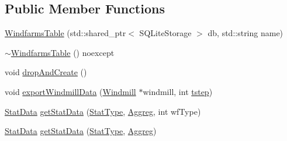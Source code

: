 \subsection*{Public Member Functions}
\begin{DoxyCompactItemize}
\item 
\mbox{\hyperlink{class_windfarms_table_a5d8d669ea442364440e5e2e92f5048b1}{Windfarms\+Table}} (std\+::shared\+\_\+ptr$<$ S\+Q\+Lite\+Storage $>$ db, std\+::string name)
\item 
\mbox{\hyperlink{class_windfarms_table_a39f4f1e8f169fee846df510dad569f2d}{$\sim$\+Windfarms\+Table}} () noexcept
\item 
void \mbox{\hyperlink{class_windfarms_table_aab2a278f7454d62d77d37b048da1a5c1}{drop\+And\+Create}} ()
\item 
void \mbox{\hyperlink{class_windfarms_table_a91aa9c6965213361b5e1fc151976d9ca}{export\+Windmill\+Data}} (\mbox{\hyperlink{class_windmill}{Windmill}} $\ast$windmill, int \mbox{\hyperlink{thread__vessels_8cpp_a84bc73d278de929ec9974e1a95d9b23a}{tstep}})
\item 
\mbox{\hyperlink{struct_windfarms_table_1_1_stat_data}{Stat\+Data}} \mbox{\hyperlink{class_windfarms_table_adb850840c3750a4842783990bcd423a0}{get\+Stat\+Data}} (\mbox{\hyperlink{class_windfarms_table_a882699395a936d2997b9482c08fe8515}{Stat\+Type}}, \mbox{\hyperlink{class_windfarms_table_a59a8562d196d503dd3420e06a4613696}{Aggreg}}, int wf\+Type)
\item 
\mbox{\hyperlink{struct_windfarms_table_1_1_stat_data}{Stat\+Data}} \mbox{\hyperlink{class_windfarms_table_a4e1a8255155a82e2c9e76b3a90431da1}{get\+Stat\+Data}} (\mbox{\hyperlink{class_windfarms_table_a882699395a936d2997b9482c08fe8515}{Stat\+Type}}, \mbox{\hyperlink{class_windfarms_table_a59a8562d196d503dd3420e06a4613696}{Aggreg}})
\end{DoxyCompactItemize}
